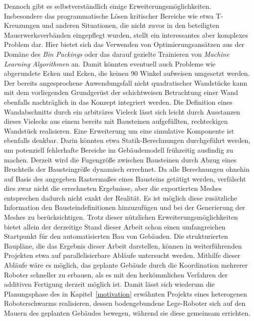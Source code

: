 Dennoch gibt es selbstverständlich einige Erweiterungsmöglichkeiten.
Insbesondere das programmatische Lösen kritischer Bereiche wie etwa T-Kreuzungen und anderen Situationen, die nicht zuvor in den beteiligten Mauerwerksverbänden eingepflegt wurden, stellt ein interessantes aber komplexes Problem dar.
Hier bietet sich das Verwenden von Optimierungsansätzen aus der Domäne des \textit{Bin Packings} oder das darauf gezielte Trainieren von \textit{Machine Learning Algorithmen} an.
Damit könnten eventuell auch Probleme wie abgerundete Ecken und Ecken, die keinen 90\textdegree{} Winkel aufweisen umgesetzt werden.
Der bereits angesprochene Anwendungsfall nicht quadratischer Wandstücke kann mit dem vorliegenden Grundgerüst der schichtweisen Betrachtung einer Wand ebenfalls nachträglich in das Konzept integriert werden.
Die Definition eines Wandabschnitts durch ein arbiträres Vieleck lässt sich leicht durch \glqq{}Ausstanzen\grqq{} dieses Vielecks aus einem bereits mit Bausteinen aufgefüllten, rechteckigen Wandstück realisieren.
Eine Erweiterung um eine simulative Komponente ist ebenfalls denkbar.
Darin könnten etwa Statik-Berechnungen durchgeführt werden, um potenziell fehlerhafte Bereiche im Gebäudemodell frühzeitig ausfindig zu machen.
Derzeit wird die Fugengröße zwischen Bausteinen durch Abzug eines Bruchteils der Bausteingröße dynamisch errechnet.
Da alle Berechnungen ohnehin auf Basis des angegeben Rastermaßes eines Bausteins getätigt werden, verfälscht dies zwar nicht die errechneten Ergebnisse, aber die exportierten Meshes entsprechen dadurch nicht exakt der Realität.
Es ist möglich diese zusätzliche Information den Bausteindefinitionen hinzuzufügen und bei der Generierung der Meshes zu berücksichtigen.
Trotz dieser nützlichen Erweiterungsmöglichkeiten bietet allein der derzeitige Stand dieser Arbeit schon einen umfangreichen Startpunkt für den automatisierten Bau von Gebäuden.
Die strukturierten Baupläne, die das Ergebnis dieser Arbeit darstellen, können in weiterführenden Projekten etwa auf parallelisierbare Abläufe untersucht werden.
Mithilfe dieser Abläufe wäre es möglich, das geplante Gebäude durch die Koordination mehrerer Roboter schneller zu erbauen, als es mit den herkömmlichen Verfahren der additiven Fertigung derzeit möglich ist.
Damit lässt sich wiederum die Planungsphase des in Kapitel~\ref{motivation} erwähnten Projekts eines heterogenen Roboterschwarms realisieren, dessen bodengebundene Lege-Roboter sich auf den Mauern des geplanten Gebäudes bewegen, während sie diese gemeinsam errichten.
